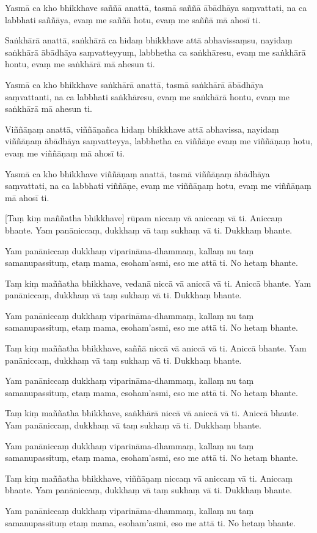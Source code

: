 Yasmā ca kho bhikkhave saññā anattā, tasmā saññā ābādhāya saṃvattati,
na ca labbhati saññāya, evaṃ me saññā hotu, evaṃ me saññā mā ahosī ti.

Saṅkhārā anattā, saṅkhārā ca hidaṃ bhikkhave attā abhavissaṃsu, nayidaṃ
saṅkhārā ābādhāya saṃvatteyyuṃ, labbhetha ca saṅkhāresu, evaṃ me
saṅkhārā hontu, evaṃ me saṅkhārā mā ahesun ti.

Yasmā ca kho bhikkhave saṅkhārā anattā, tasmā saṅkhārā ābādhāya
saṃvattanti, na ca labbhati saṅkhāresu, evaṃ me saṅkhārā hontu, evaṃ me
saṅkhārā mā ahesun ti.

Viññāṇaṃ anattā, viññāṇañca hidaṃ bhikkhave attā abhavissa, nayidaṃ
viññāṇaṃ ābādhāya saṃvatteyya, labbhetha ca viññāṇe evaṃ me viññāṇaṃ
hotu, evaṃ me viññāṇaṃ mā ahosī ti.

Yasmā ca kho bhikkhave viññāṇaṃ anattā, tasmā viññāṇaṃ ābādhāya
saṃvattati, na ca labbhati viññāṇe, evaṃ me viññāṇaṃ hotu, evaṃ me
viññāṇaṃ mā ahosī ti.

[Taṃ kiṃ maññatha bhikkhave] rūpam niccaṃ vā aniccaṃ vā ti.
Aniccaṃ bhante.
Yam panāniccaṃ, dukkhaṃ vā taṃ sukhaṃ vā ti.
Dukkhaṃ bhante.

Yam panāniccaṃ dukkhaṃ viparināma-dhammaṃ, kallaṃ nu taṃ samanupassituṃ,
etaṃ mama, esoham'asmi, eso me attā ti.
No hetaṃ bhante.

Taṃ kiṃ maññatha bhikkhave, vedanā niccā vā aniccā vā ti.
Aniccā bhante.
Yam panāniccaṃ, dukkhaṃ vā taṃ sukhaṃ vā ti.
Dukkhaṃ bhante.

Yam panāniccaṃ dukkhaṃ viparināma-dhammaṃ, kallaṃ nu taṃ samanupassituṃ,
etaṃ mama, esoham'asmi, eso me attā ti.
No hetaṃ bhante.

Taṃ kiṃ maññatha bhikkhave, saññā niccā vā aniccā vā ti.
Aniccā bhante.
Yam panāniccaṃ, dukkhaṃ vā taṃ sukhaṃ vā ti.
Dukkhaṃ bhante.

Yam panāniccaṃ dukkhaṃ viparināma-dhammaṃ, kallaṃ nu taṃ samanupassituṃ,
etaṃ mama, esoham'asmi, eso me attā ti.
No hetaṃ bhante.

Taṃ kiṃ maññatha bhikkhave, saṅkhārā niccā vā aniccā vā ti.
Aniccā bhante.
Yam panāniccaṃ, dukkhaṃ vā taṃ sukhaṃ vā ti.
Dukkhaṃ bhante.

Yam panāniccaṃ dukkhaṃ viparināma-dhammaṃ, kallaṃ nu taṃ samanupassituṃ,
etaṃ mama, esoham'asmi, eso me attā ti.
No hetaṃ bhante.

Taṃ kiṃ maññatha bhikkhave, viññāṇaṃ niccaṃ vā aniccaṃ vā ti.
Aniccaṃ bhante.
Yam panāniccaṃ, dukkhaṃ vā taṃ sukhaṃ vā ti.
Dukkhaṃ bhante.

Yam panāniccaṃ dukkhaṃ viparināma-dhammaṃ, kallaṃ nu taṃ samanupassituṃ
etaṃ mama, esoham'asmi, eso me attā ti.
No hetaṃ bhante.

